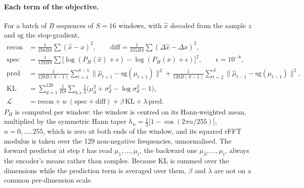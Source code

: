 \documentclass{article}
\begin{document}
\paragraph{Each term of the objective.} For a batch of $B$ sequences of $S = 16$ windows, with
$\hat{x}$ decoded from the sample $z$ and $\mathrm{sg}$ the stop-gradient,
\begin{align*}
\mathrm{recon} &= \tfrac{1}{256BS}\textstyle\sum (\hat{x}-x)^{2}, \qquad
\mathrm{diff} = \tfrac{1}{255BS}\textstyle\sum (\Delta\hat{x}-\Delta x)^{2}, \\
\mathrm{spec} &= \tfrac{1}{129BS}\textstyle\sum \big[\log(P_{H}(\hat{x})+\epsilon)-\log(P_{H}(x)+\epsilon)\big]^{2},
\qquad \epsilon = 10^{-8}, \\
\mathrm{pred} &= \tfrac{1}{128B(S-1)}\textstyle\sum_{t=1}^{S-1}
\|\hat{\mu}_{t+1}-\mathrm{sg}(\mu_{t+1})\|^{2} + \tfrac{1}{128B(S-1)}\textstyle\sum_{t=2}^{S}
\|\hat{\mu}_{t-1}-\mathrm{sg}(\mu_{t-1})\|^{2}, \\
\mathrm{KL} &= \textstyle\sum_{d=1}^{128} \tfrac{1}{BS}\sum_{b,s}
\tfrac{1}{2}\big(\mu_{d}^{2}+\sigma_{d}^{2}-\log\sigma_{d}^{2}-1\big), \\
\mathcal{L} &= \mathrm{recon} + w\,(\mathrm{spec}+\mathrm{diff}) + \beta\,\mathrm{KL} + \lambda\,\mathrm{pred}.
\end{align*}
$P_{H}$ is computed per window: the window is centred on its Hann-weighted mean, multiplied by the
symmetric Hann taper $h_{n} = \tfrac{1}{2}\big[1-\cos(2\pi n/255)\big]$, $n = 0,\dots,255$, which is zero at
both ends of the window, and its squared rFFT modulus is taken over the 129 non-negative frequencies,
unnormalised. The forward predictor at step $t$ has read $\mu_{1},\dots,\mu_{t}$, the backward one
$\mu_{S},\dots,\mu_{t}$, always the encoder's means rather than samples. Because KL is summed over
the dimensions while the prediction term is averaged over them, $\beta$ and $\lambda$ are not on a
common per-dimension scale.
\end{document}
